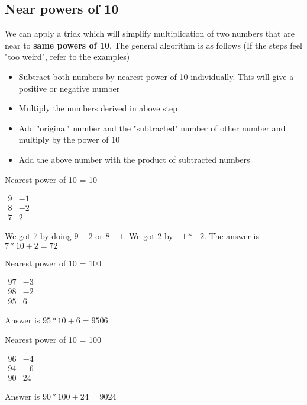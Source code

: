 \subsection{Near powers of 10}

We can apply a trick which will simplify multiplication of two numbers that are near to \textbf{same powers of 10}. The general algorithm is as follows (If the steps feel "too weird", refer to the examples)

\begin{itemize}
    \item Subtract both numbers by nearest power of 10 individually. This will give a positive or negative number
    \item Multiply the numbers derived in above step
    \item Add "original" number and the "subtracted" number of other number and multiply by the power of 10
    \item Add the above number with the product of subtracted numbers
\end{itemize}

Nearest power of 10 = 10

$
\begin{matrix}
    9 & -1 \\
    8 & -2 \\
    \hline
    7  & 2
\end{matrix}
$

We got 7 by doing $9 - 2$ or $8 - 1$. We got 2 by $-1 * -2$. The answer is $7 * 10 + 2 = 72$

Nearest power of 10 = 100

$
\begin{matrix}
    97 & -3 \\
    98 & -2 \\
    \hline
    95 & 6
\end{matrix}
$

Answer is $95 * 10 + 6 = 9506$


Nearest power of 10 = 100

$
\begin{matrix}
    96 & -4 \\
    94 & -6 \\
    \hline
    90 & 24
\end{matrix}
$

Answer is $90 * 100 + 24 = 9024$


